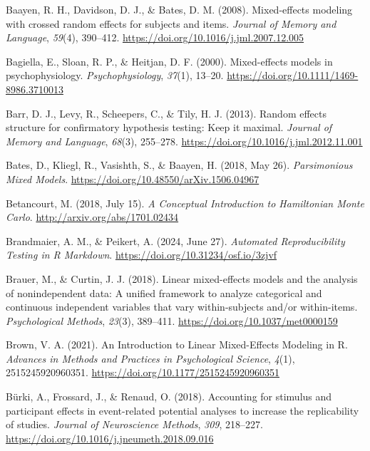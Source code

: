 \documentclass[
  doc,12pt,floatsintext]{apa7}
\newlength{\cslhangindent}
\newenvironment{CSLReferences}[2] %
 {\begin{list}{}{%
  \setlength{\itemindent}{0pt}
  \setlength{\leftmargin}{0pt}
  \setlength{\parsep}{0pt}
  \ifodd #1
   \setlength{\leftmargin}{\cslhangindent}
   \setlength{\itemindent}{-1\cslhangindent}
  \fi
  \setlength{\itemsep}{#2\baselineskip}}}
 {\end{list}}
\begin{document}
\label{refs}
\begin{CSLReferences}{1}{0}
Baayen, R. H., Davidson, D. J., \& Bates, D. M. (2008). Mixed-effects modeling with crossed random effects for subjects and items. \emph{Journal of Memory and Language}, \emph{59}(4), 390--412. \url{https://doi.org/10.1016/j.jml.2007.12.005}

Bagiella, E., Sloan, R. P., \& Heitjan, D. F. (2000). Mixed-effects models in psychophysiology. \emph{Psychophysiology}, \emph{37}(1), 13--20. \url{https://doi.org/10.1111/1469-8986.3710013}

Barr, D. J., Levy, R., Scheepers, C., \& Tily, H. J. (2013). Random effects structure for confirmatory hypothesis testing: {Keep} it maximal. \emph{Journal of Memory and Language}, \emph{68}(3), 255--278. \url{https://doi.org/10.1016/j.jml.2012.11.001}

Bates, D., Kliegl, R., Vasishth, S., \& Baayen, H. (2018, May 26). \emph{Parsimonious {Mixed Models}}. \url{https://doi.org/10.48550/arXiv.1506.04967}

Betancourt, M. (2018, July 15). \emph{A {Conceptual Introduction} to {Hamiltonian Monte Carlo}}. \url{http://arxiv.org/abs/1701.02434}

Brandmaier, A. M., \& Peikert, A. (2024, June 27). \emph{Automated {Reproducibility Testing} in {R Markdown}}. \url{https://doi.org/10.31234/osf.io/3zjvf}

Brauer, M., \& Curtin, J. J. (2018). Linear mixed-effects models and the analysis of nonindependent data: {A} unified framework to analyze categorical and continuous independent variables that vary within-subjects and/or within-items. \emph{Psychological Methods}, \emph{23}(3), 389--411. \url{https://doi.org/10.1037/met0000159}

Brown, V. A. (2021). An {Introduction} to {Linear Mixed-Effects Modeling} in {R}. \emph{Advances in Methods and Practices in Psychological Science}, \emph{4}(1), 2515245920960351. \url{https://doi.org/10.1177/2515245920960351}

Bürki, A., Frossard, J., \& Renaud, O. (2018). Accounting for stimulus and participant effects in event-related potential analyses to increase the replicability of studies. \emph{Journal of Neuroscience Methods}, \emph{309}, 218--227. \url{https://doi.org/10.1016/j.jneumeth.2018.09.016}


\end{CSLReferences}
\end{document}

